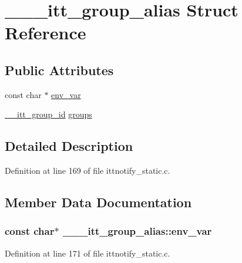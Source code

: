 \hypertarget{struct______itt__group__alias}{\section{\-\_\-\-\_\-\-\_\-itt\-\_\-group\-\_\-alias Struct Reference}
\label{struct______itt__group__alias}
}
\subsection*{Public Attributes}
\begin{DoxyCompactItemize}
\item 
const char $\ast$ \hyperlink{struct______itt__group__alias_a81ff6c9390e517806319fab580899de4}{env\-\_\-var}
\item 
\hyperlink{ittnotify__types_8h_ab43d42e38047ed421321091868ff992b}{\-\_\-\-\_\-itt\-\_\-group\-\_\-id} \hyperlink{struct______itt__group__alias_a6ea6f53acf7e9d24b01b81243ecd94d6}{groups}
\end{DoxyCompactItemize}


\subsection{Detailed Description}


Definition at line 169 of file ittnotify\-\_\-static.\-c.



\subsection{Member Data Documentation}
\hypertarget{struct______itt__group__alias_a81ff6c9390e517806319fab580899de4}{
\subsubsection[{env\-\_\-var}]{\setlength{\rightskip}{0pt plus 5cm}const char$\ast$ \-\_\-\-\_\-\-\_\-itt\-\_\-group\-\_\-alias\-::env\-\_\-var}}\label{struct______itt__group__alias_a81ff6c9390e517806319fab580899de4}


Definition at line 171 of file ittnotify\-\_\-static.\-c.



